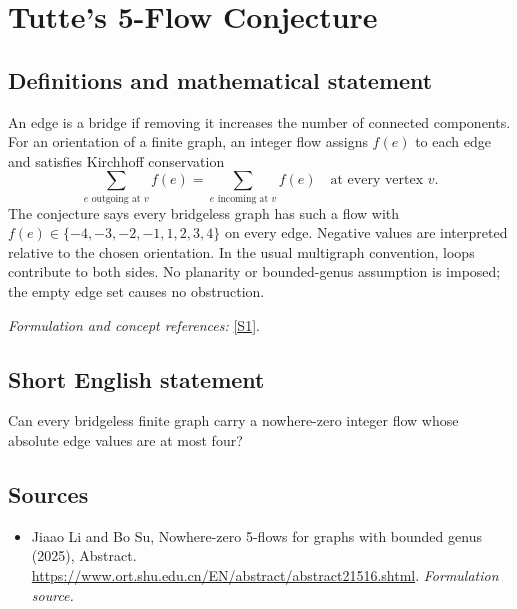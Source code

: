 \documentclass[11pt]{article}
\begin{document}
\section*{\texorpdfstring{Tutte's 5-Flow Conjecture}{Tutte's 5-Flow Conjecture}}\label{1443}
\subsection{Definitions and mathematical statement}
An edge is a bridge if removing it increases the number of connected components. For an orientation of a finite graph, an integer flow assigns $f(e)$ to each edge and satisfies Kirchhoff conservation
\[
 \sum_{e\text{ outgoing at }v}f(e)=\sum_{e\text{ incoming at }v}f(e)
 \quad\text{at every vertex }v.
\]
The conjecture says every bridgeless graph has such a flow with
$f(e)\in\{-4,-3,-2,-1,1,2,3,4\}$ on every edge. Negative values are interpreted relative to the chosen orientation. In the usual multigraph convention, loops contribute to both sides. No planarity or bounded-genus assumption is imposed; the empty edge set causes no obstruction.
\par\smallskip\textit{Formulation and concept references:} \href{https://www.ort.shu.edu.cn/EN/abstract/abstract21516.shtml}{[S1]}.

\subsection{Short English statement}
Can every bridgeless finite graph carry a nowhere-zero integer flow whose absolute edge values are at most four?
\subsection{Sources}
\begin{itemize}
\item[S1]Jiaao Li and Bo Su, Nowhere-zero 5-flows for graphs with bounded genus (2025), Abstract.
\url{https://www.ort.shu.edu.cn/EN/abstract/abstract21516.shtml}.
\textit{Formulation source.}
\end{itemize}
\end{document}
